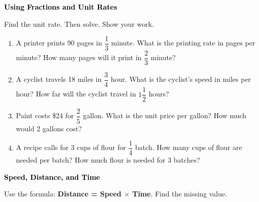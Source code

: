 \documentclass[12pt, letterpaper, fleqn]{article}
\begin{document}
\newpage

\begin{tcolorbox}[colback=customteal!20]
\large\textcolor{black}{\textbf{Using Fractions and Unit Rates}}
\end{tcolorbox}

\noindent
Find the unit rate. Then solve. Show your work.

\vspace{3mm}

\begin{enumerate}[itemsep=2.2cm, leftmargin=0.6cm]
\item A printer prints 90 pages in $\dfrac{1}{3}$ minute. What is the printing rate in pages per minute? How many pages will it print in $\dfrac{2}{3}$ minute?\\
\vspace{2.3cm}

\item A cyclist travels 18 miles in $\dfrac{3}{4}$ hour. What is the cyclist's speed in miles per hour? How far will the cyclist travel in $1\dfrac{1}{2}$ hours?\\
\vspace{2.3cm}

\item Paint costs \$24 for $\dfrac{2}{5}$ gallon. What is the unit price per gallon? How much would 2 gallons cost?\\
\vspace{2.3cm}

\item A recipe calls for 3 cups of flour for $\dfrac{1}{4}$ batch. How many cups of flour are needed per batch? How much flour is needed for 3 batches?\\
\vspace{2.5cm}

\end{enumerate}

\newpage

\begin{tcolorbox}[colback=customteal!20]
\large\textcolor{black}{\textbf{Speed, Distance, and Time}}
\end{tcolorbox}

\noindent
Use the formula: \textbf{Distance = Speed $\times$ Time}. Find the missing value.
\end{document}
